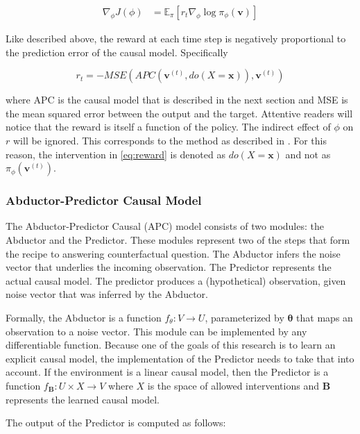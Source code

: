 \documentclass{article}
\begin{document}
\begin{align}
    \nabla_\phi J(\phi) &= \mathbb{E}_\pi \left[
    r_t \nabla_\phi\log\pi_\phi(\mathbf{v}) \right]
\end{align}

Like described above, the reward at each time step is negatively proportional to the prediction error of the causal model. Specifically

\begin{equation}
    r_t = - MSE\left(APC(\mathbf{v}^{(t)}, do(X=\mathbf{x})), \mathbf{v}^{(t)}\right)
\end{equation}\label{eq:reward}

where APC is the causal model that is described in the next section and MSE is the mean squared error between the output and the target. Attentive readers will notice that the reward is itself a function of the policy. The indirect effect of $\phi$ on $r$ will be ignored. This corresponds to the method as described in \cite{pathak2017curiosity}. For this reason, the intervention in \autoref{eq:reward} is denoted as $do(X=\mathbf{x})$ and not as $\pi_\phi(\mathbf{v}^{(t)})$.

\subsubsection{Abductor-Predictor Causal Model}

The Abductor-Predictor Causal (APC) model consists of two modules: the Abductor and the Predictor. These modules represent two of the steps that form the recipe to answering counterfactual question. The Abductor infers the noise vector that underlies the incoming observation. The Predictor represents the actual causal model. The predictor produces a (hypothetical) observation, given noise vector that was inferred by the Abductor.

Formally, the Abductor is a function $f_\theta : V \rightarrow U$, parameterized by $\mathbf{\theta}$ that maps an observation to a noise vector. This module can be implemented by any differentiable function. Because one of the goals of this research is to learn an explicit causal model, the implementation of the Predictor needs to take that into account. If the environment is a linear causal model, then the Predictor is a function $f_\mathbf{B} : U \times X \rightarrow V $ where $X$ is the space of allowed interventions and $\mathbf{B}$ represents the learned causal model.

The output of the Predictor is computed as follows:
\end{document}
